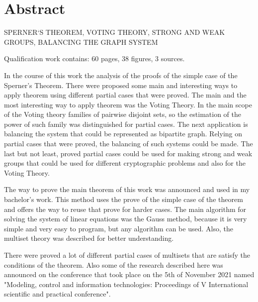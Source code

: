 \chapter*{Abstract}

\MakeUppercase{Sperner`s theorem, voting theory, strong and weak groups, balancing the graph system}

Qualification work contains: 60 pages, 38 figures, 3 sources.

	In the course of this work the analysis of the proofs of the simple case of the Sperner's Theorem. There were proposed some main and interesting ways to apply theorem using different partial cases that were proved. The main and the most interesting way to apply theorem was the Voting Theory. In the main scope of the Voting theory families of pairwise disjoint sets, so the estimation of the power of such family was distinguished for partial cases. The next application is balancing the system that could be represented as bipartite graph. Relying on partial cases that were proved, the balancing of such systems could be made. The last but not least, proved partial cases could be used for making strong and weak groups that could be used for different cryptographic problems and also for the Voting Theory.
	
	The way to prove the main theorem of this work was announced and used in my bachelor's work. This method uses the prove of the simple case of the theorem and offers the way to reuse that prove for harder cases. The main algorithm for solving the system of linear equations was the Gauss method, because it is very simple and very easy to program, but any algorithm can be used. Also, the multiset theory was described for better understanding. 

	There were proved a lot of different partial cases of multisets that are satisfy the conditions of the theorem. Also some of the research described here was announced on the conference that took place on the 5th of November 2021 named "Modeling, control and information technologies: Proceedings of V International scientific and practical conference".